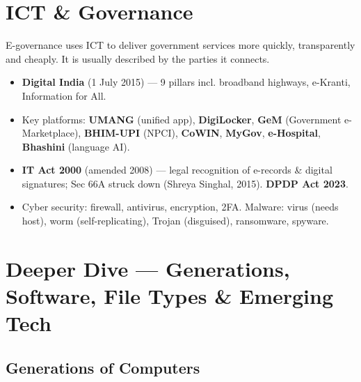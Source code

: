 \needspace{125pt}

\hypertarget{p1-08--7-ict--governance}{%
\section{ICT \& Governance}\label{p1-08--7-ict--governance}}

E-governance uses ICT to deliver government services more quickly, transparently and cheaply. It is
usually described by the parties it connects.



\begin{itemize}
\tightlist
\item
  \textbf{Digital India} (1 July 2015) --- 9 pillars incl. broadband highways, e-Kranti, Information for All.
\item
  Key platforms: \textbf{UMANG} (unified app), \textbf{DigiLocker}, \textbf{GeM} (Government e-Marketplace), \textbf{BHIM-UPI} (NPCI), \textbf{CoWIN}, \textbf{MyGov}, \textbf{e-Hospital}, \textbf{Bhashini} (language AI).
\item
  \textbf{IT Act 2000} (amended 2008) --- legal recognition of e-records \& digital signatures; Sec 66A struck down (Shreya Singhal, 2015). \textbf{DPDP Act 2023}.
\item
  Cyber security: firewall, antivirus, encryption, 2FA. Malware: virus (needs host), worm (self-replicating), Trojan (disguised), ransomware, spyware.
\end{itemize}

\needspace{166pt}

\hypertarget{p1-08--8-deeper-dive--generations-software-file-types--emerging-tech}{%
\section{Deeper Dive --- Generations, Software, File Types \& Emerging Tech}\label{p1-08--8-deeper-dive--generations-software-file-types--emerging-tech}}

\needspace{130pt}

\hypertarget{p1-08--81-generations-of-computers}{%
\subsection{Generations of Computers}\label{p1-08--81-generations-of-computers}}

\begingroup\small

